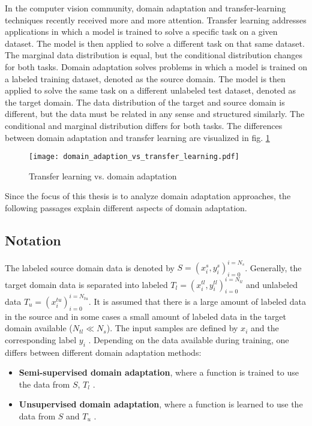 In the computer vision community, domain adaptation and transfer-learning techniques recently received more and more attention. Transfer learning addresses applications in which a model is trained to solve a specific task on a given dataset. The model is then applied to solve a different task on that same dataset. The marginal data distribution is equal, but the conditional distribution changes for both tasks. Domain adaptation solves problems in which a model is trained on a labeled training dataset, denoted as the source domain. The model is then applied to solve the same task on a different unlabeled test dataset, denoted as the target domain. The data distribution of the target and source domain is different, but the data must be related in any sense and structured similarly. The conditional and marginal distribution differs for both tasks. The differences between domain adaptation and transfer learning are visualized in fig. \ref{fig:domain_adaption_vs_transfer_learning}

\begin{figure}[H]
  \centering
  \texttt{[image: domain\_adaption\_vs\_transfer\_learning.pdf]}
  \caption {Transfer learning vs. domain adaptation} \label{fig:domain_adaption_vs_transfer_learning}
\end{figure}

Since the focus of this thesis is to analyze domain adaptation approaches, the following passages explain different aspects of domain adaptation.
\subsection{Notation}
The labeled source domain data is denoted by  $S = {(x_{i}^{s}, y_{i}^{s})_{i = 0}^{i = N_{s}}}$. Generally, the target domain data is separated into labeled $T_{l} = {(x_{i}^{tl}, y_{i}^{tl})_{i = 0}^{i = N_{tl}}}$ and unlabeled data $T_{u} = {(x_{i}^{tu})_{i = 0}^{i = N_{tu}}}$. It is assumed that there is a large amount of labeled data in the source and in some cases a small amount of labeled data in the target domain available ($N_{tl} \ll N_{s}$). The input samples are defined by $x_{i}$ and the corresponding label $y_{i}$  \cite{Patel2015}. Depending on the data available during training, one differs between different domain adaptation methods: 
\begin{itemize}
\item \textbf{Semi-supervised domain adaptation}, where a function is trained to use the data from $S$, $T_{l}$ \cite{Patel2015}. 
\item \textbf{Unsupervised domain adaptation}, where a function is learned to use the data from $S$ and $T_{u}$ \cite{Patel2015}.
\end{itemize}

